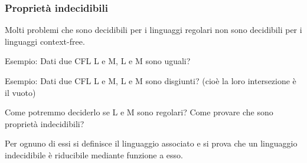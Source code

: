 \subsubsection{Proprietà indecidibili}

Molti problemi che sono decidibili per i
linguaggi regolari non sono decidibili per i
linguaggi context-free.

Esempio: Dati due CFL L e M, L e M sono
uguali?

Esempio: Dati due CFL L e M, L e M sono
disgiunti? (cioè la loro intersezione è il vuoto)

Come potremmo deciderlo se L e M sono regolari? Come provare che sono proprietà indecidibili?

Per ognuno di essi si definisce il linguaggio
associato e si prova che un linguaggio
indecidibile è riducibile mediante funzione a
esso.



\let\cleardoublepage\clearpage

